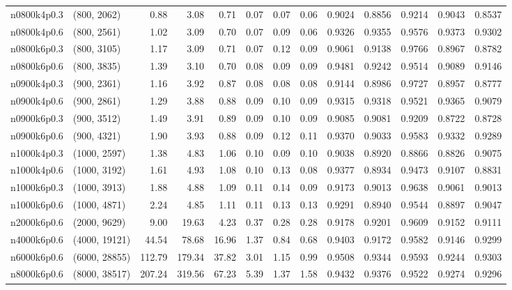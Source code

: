 \begin{tabular}{llrrrrrrrrrrr}
n0800k4p0.3 &   (800, 2062) &   0.88 &   3.08 &  0.71 & 0.07 &  0.07 &   0.06 &   0.9024 &   0.8856 &    0.9214 &     0.9043 &      0.8537 \\
n0800k4p0.6 &   (800, 2561) &   1.02 &   3.09 &  0.70 & 0.07 &  0.09 &   0.06 &   0.9326 &   0.9355 &    0.9576 &     0.9373 &      0.9302 \\
n0800k6p0.3 &   (800, 3105) &   1.17 &   3.09 &  0.71 & 0.07 &  0.12 &   0.09 &   0.9061 &   0.9138 &    0.9766 &     0.8967 &      0.8782 \\
n0800k6p0.6 &   (800, 3835) &   1.39 &   3.10 &  0.70 & 0.08 &  0.09 &   0.09 &   0.9481 &   0.9242 &    0.9514 &     0.9089 &      0.9146 \\
n0900k4p0.3 &   (900, 2361) &   1.16 &   3.92 &  0.87 & 0.08 &  0.08 &   0.08 &   0.9144 &   0.8986 &    0.9727 &     0.8957 &      0.8777 \\
n0900k4p0.6 &   (900, 2861) &   1.29 &   3.88 &  0.88 & 0.09 &  0.10 &   0.09 &   0.9315 &   0.9318 &    0.9521 &     0.9365 &      0.9079 \\
n0900k6p0.3 &   (900, 3512) &   1.49 &   3.91 &  0.89 & 0.09 &  0.10 &   0.09 &   0.9085 &   0.9081 &    0.9209 &     0.8722 &      0.8728 \\
n0900k6p0.6 &   (900, 4321) &   1.90 &   3.93 &  0.88 & 0.09 &  0.12 &   0.11 &   0.9370 &   0.9033 &    0.9583 &     0.9332 &      0.9289 \\
n1000k4p0.3 &  (1000, 2597) &   1.38 &   4.83 &  1.06 & 0.10 &  0.09 &   0.10 &   0.9038 &   0.8920 &    0.8866 &     0.8826 &      0.9075 \\
n1000k4p0.6 &  (1000, 3192) &   1.61 &   4.93 &  1.08 & 0.10 &  0.13 &   0.08 &   0.9377 &   0.8934 &    0.9473 &     0.9107 &      0.8831 \\
n1000k6p0.3 &  (1000, 3913) &   1.88 &   4.88 &  1.09 & 0.11 &  0.14 &   0.09 &   0.9173 &   0.9013 &    0.9638 &     0.9061 &      0.9013 \\
n1000k6p0.6 &  (1000, 4871) &   2.24 &   4.85 &  1.11 & 0.11 &  0.13 &   0.13 &   0.9291 &   0.8940 &    0.9544 &     0.8897 &      0.9047 \\
n2000k6p0.6 &  (2000, 9629) &   9.00 &  19.63 &  4.23 & 0.37 &  0.28 &   0.28 &   0.9178 &   0.9201 &    0.9609 &     0.9152 &      0.9111 \\
n4000k6p0.6 & (4000, 19121) &  44.54 &  78.68 & 16.96 & 1.37 &  0.84 &   0.68 &   0.9403 &   0.9172 &    0.9582 &     0.9146 &      0.9299 \\
n6000k6p0.6 & (6000, 28855) & 112.79 & 179.34 & 37.82 & 3.01 &  1.15 &   0.99 &   0.9508 &   0.9344 &    0.9593 &     0.9244 &      0.9303 \\
n8000k6p0.6 & (8000, 38517) & 207.24 & 319.56 & 67.23 & 5.39 &  1.37 &   1.58 &   0.9432 &   0.9376 &    0.9522 &     0.9274 &      0.9296 \\
\bottomrule
\end{tabular}

